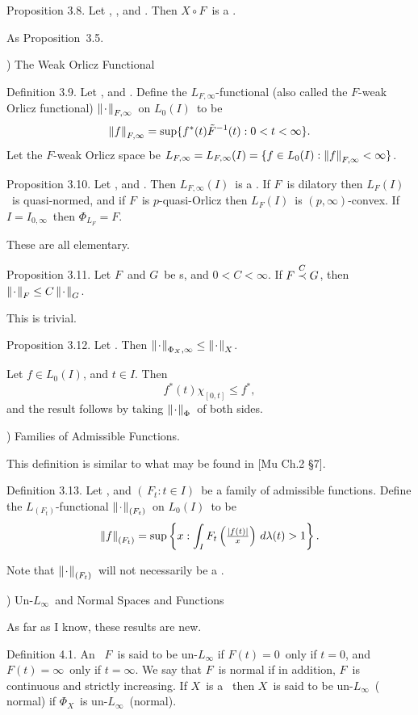 \proclaim Proposition 3.8. Let \Ibasms, \Xbaris\onI, and \Fbaaf.
Then
$X\circ F$\ is a \ris\onI.
 
\Proof As Proposition~3.5.
\endproof
 
) The Weak Orlicz Functional
 
\proclaim Definition 3.9. Let \Ibasms, and \Fbaaf. Define the
{\dt $L_{F,\infty}$-functional} (also called the {\dt $F$-weak Orlicz
functional})
$\left\| \kern0.8pt\cdot\kern0.8pt \right\|_{F,\infty}$\ on $L_0(I)$\ to be
$$ \left\| f \right\|_{F,\infty} =
   \sup \{ f^*(t) \tilde F^{-1}(t) : 0<t<\infty \} .$$
Let the {\dt $F$-weak Orlicz space} be $L_{F,\infty} = L_{F,\infty}(I)
= \{ f\in L_0(I) : \left\| f \right\|_{F,\infty} < \infty \}$.
 
\proclaim Proposition 3.10. Let \Ibasms, and \Fbaaf. Then $L_{F,\infty}(I)$\
is
a \ris. If $F$\ is dilatory then $L_F(I)$\ is quasi-normed, and if
$F$\ is
$p$-quasi-Orlicz then $L_F(I)$\ is $(p,\infty)$-convex. If $I=I_{0,\infty}$\
then $\Phi_{L_F} = F$.
 
\Proof These are all elementary.
\endproof
 
\proclaim Proposition 3.11. Let $F$\ and $G$\ be \af s, and $0<C<\infty$.
If
$F\labelledprec C G$, then $\left\| \kern0.8pt\cdot\kern0.8pt \right\|_F\le C\left\| \kern0.8pt\cdot\kern0.8pt \right\|_G$.
 
\Proof This is trivial.
\endproof
 
\proclaim Proposition 3.12. Let \Xbaris\onIzi. Then $\left\| \kern0.8pt\cdot\kern0.8pt \right\|_{\Phi_X,\infty}
\le
\left\| \kern0.8pt\cdot\kern0.8pt \right\|_X$.
 
\Proof Let $f\in L_0(I)$, and $t\in I$. Then
$$f^*(t) \chi_{[0,t]} \le f^* ,$$
and the result follows by taking $\left\| \kern0.8pt\cdot\kern0.8pt \right\|_\Phi$\ of both sides.
\endproof
 
) Families of Admissible Functions.
 
This definition is similar to what may be found in [Mu Ch.2 \S7].
 
\proclaim Definition 3.13. Let \Ibasms, and $(\,F_t:t\in I)$\ be
a family of
admissible functions. Define the {\dt $L_{(F_t)}$-functional}
$\left\| \kern0.8pt\cdot\kern0.8pt \right\|_{(F_t)}$\ on $L_0(I)$\ to be
$$ \left\| f \right\|_{(F_t)} =
   \sup \left\{ x : \int_I F_t\left({\textstyle{\left|f(t)\right|\over x}}\right)
\,d\lambda(t)
   > 1 \right\} .$$
 
Note that $\left\| \kern0.8pt\cdot\kern0.8pt \right\|_{(F_t)}$\ will not necessarily be a \rif.
 
\vfill
\eject
 
) Un-$L_\infty$\ and Normal Spaces and Functions
 
As far as I know, these results are new.
 
\proclaim Definition 4.1. An \af\ $F$\ is said to be {\dt un-$L_\infty$}
if
$F(t)=0$\ only if $t=0$, and $F(t)=\infty$\ only if $t=\infty$. We
say that
$F$\ is {\dt normal} if in addition, $F$\ is continuous and strictly
increasing.
\moreproclaim
If $X$\ is a \ris\onIzi\ then $X$\ is said to be {\dt un-$L_\infty$}\
({\dt
normal}) if $\Phi_X$\ is un-$L_\infty$\ (normal).
 
